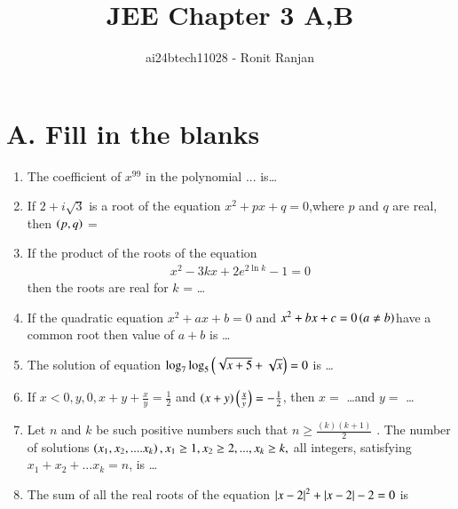 \documentclass[journal,12pt,twocolumn]{IEEEtran}
\theoremstyle{remark}
\begin{document}

\vspace{3cm}

\title{JEE Chapter 3 A,B}
\author{ai24btech11028 - Ronit Ranjan}
\maketitle
\newpage
\bigskip
\section*{A. Fill in the blanks}
\begin{enumerate}
    \item The coefficient of $x^{99}$ in the polynomial ...
    is\dots \hfill {}
    
    \item If $2+i\sqrt{3}$ is a root of the equation $x^2 + px +q =0$,where $p$ and $q$ are real, then $\left(p,q\right)$ = \brak{\dots , \dots}\hfill {}
    
    \item If the product of the roots of the equation\\
    \begin{align*}
        x^2 -3kx +2e^{2\ln{k}} -1=0
    \end{align*}
    then the roots are real for $k$ = \dots\hfill {}
    
    \item If the quadratic equation $x^2 + ax +b=0$ and $x^2 + bx + c=0 \left(a \ne b\right)$have a common root then value of $a+b$ is \dots \hfill {}
    
    \item The solution of equation $\log_{7}\log_{5}\left(\sqrt{x+5}+\sqrt{x}\right)=0$ is \dots \hfill {}
    
    \item If $x<0, y,0, x + y + \frac{x}{y} = \frac{1}{2}$ and $\left(x+y\right)\left(\frac{x
    }{y}\right) = -\frac{1}{2}$, then $x=$ \dots and $y=$ \dots \hfill {}
    
    \item Let $n$ and $k$ be such positive numbers such that $n \geq \frac{(k)(k+1)}{2}$ . The number of solutions $\left(x_1,x_2,....x_k\right), x_1 \geq 1, x_2 \geq 2,...,x_k \geq k, $ all integers, satisfying $x_1+x_2+...x_k = n$, is \dots  \hfill {}
    \item The sum of all the real roots of the equation $\left\vert x-2\right\vert^2+\left\vert x-2\right\vert-2 = 0$ is \hfill {}
\end{enumerate}
\end{document}
